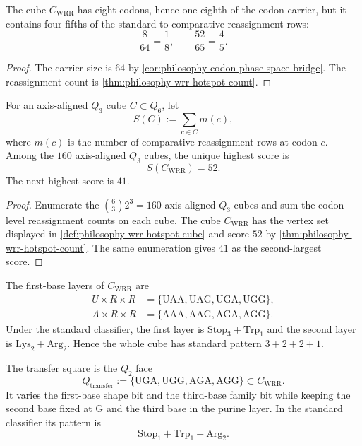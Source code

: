 \begin{corollary}
\label{cor:philosophy-comparative-variation-concentrated-wrr}
The cube $C_{\mathrm{WRR}}$ has eight codons, hence one eighth of the
codon carrier, but it contains four fifths of the standard-to-comparative
reassignment rows:
$$
  \frac{8}{64}=\frac{1}{8},
  \qquad
  \frac{52}{65}=\frac{4}{5}.
$$
\end{corollary}
\begin{proof}
The carrier size is $64$ by \autoref{cor:philosophy-codon-phase-space-bridge}.
The reassignment count is \autoref{thm:philosophy-wrr-hotspot-count}.
\end{proof}

\begin{theorem}
\label{thm:philosophy-wrr-highest-scoring-q-three-cube}
For an axis-aligned $Q_{3}$ cube $C\subset Q_{6}$, let
$$
  S(C):=\sum_{c\in C}m(c),
$$
where $m(c)$ is the number of comparative reassignment rows at codon
$c$. Among the $160$ axis-aligned $Q_{3}$ cubes, the unique highest
score is
$$
  S(C_{\mathrm{WRR}})=52.
$$
The next highest score is $41$.
\end{theorem}
\begin{proof}
Enumerate the $\binom{6}{3}2^{3}=160$ axis-aligned $Q_{3}$ cubes and
sum the codon-level reassignment counts on each cube. The cube
$C_{\mathrm{WRR}}$ has the vertex set displayed in
\autoref{def:philosophy-wrr-hotspot-cube} and score $52$ by
\autoref{thm:philosophy-wrr-hotspot-count}. The same enumeration gives
$41$ as the second-largest score.
\end{proof}

\begin{definition}
\label{def:philosophy-wrr-hotspot-layers}
The first-base layers of $C_{\mathrm{WRR}}$ are
$$
\begin{aligned}
  U\times R\times R
    &=\{\mathrm{UAA},\mathrm{UAG},\mathrm{UGA},\mathrm{UGG}\},\\
  A\times R\times R
    &=\{\mathrm{AAA},\mathrm{AAG},\mathrm{AGA},\mathrm{AGG}\}.
\end{aligned}
$$
Under the standard classifier, the first layer is
$\mathrm{Stop}_{3}+\mathrm{Trp}_{1}$ and the second layer is
$\mathrm{Lys}_{2}+\mathrm{Arg}_{2}$. Hence the whole cube has standard
pattern $3+2+2+1$.
\end{definition}

\begin{definition}
\label{def:philosophy-wrr-transfer-square}
The transfer square is the $Q_{2}$ face
$$
  Q_{\mathrm{transfer}}
  :=
  \{\mathrm{UGA},\mathrm{UGG},\mathrm{AGA},\mathrm{AGG}\}
  \subset C_{\mathrm{WRR}}.
$$
It varies the first-base shape bit and the third-base family bit while
keeping the second base fixed at $\mathrm{G}$ and the third base in the
purine layer. In the standard classifier its pattern is
$$
  \mathrm{Stop}_{1}+\mathrm{Trp}_{1}+\mathrm{Arg}_{2}.
$$
\end{definition}

